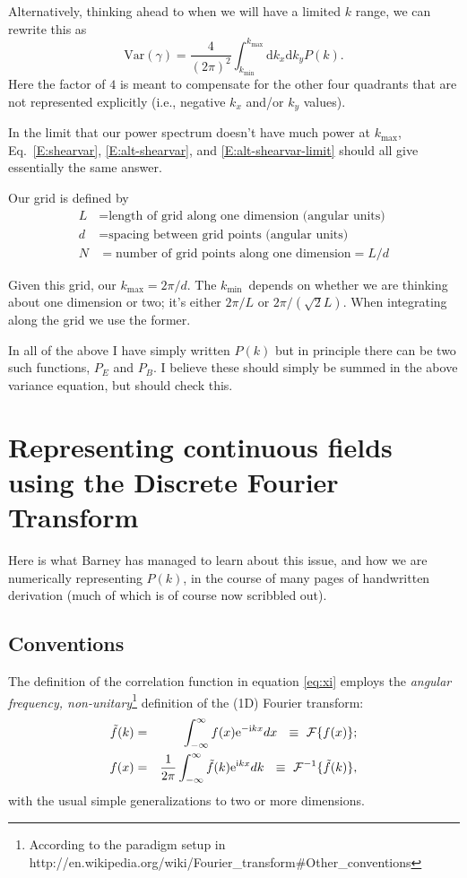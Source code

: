 \documentclass[preprint]{aastex}
\newcommand{\kmax}{\ensuremath{k_\mathrm{max}}}
\newcommand{\kmin}{\ensuremath{k_\mathrm{min}}}
\newcommand{\rmd}{\ensuremath{\mathrm{d}}}
\newcommand{\beq}{\begin{equation}}
\newcommand{\eeq}{\end{equation}}
\newcommand{\mi}{{\rm i}}
\newcommand{\me}{{\rm e}}
\begin{document}
Alternatively, thinking ahead to when we will have a limited $k$
range, we can rewrite this as
\beq\label{E:alt-shearvar-limit}
\mathrm{Var}(\gamma) = \frac{4}{(2\pi)^2} \int_{\kmin}^{\kmax} \rmd
k_x \rmd k_y P(k).
\eeq
Here the factor of $4$ is meant to compensate for the other four
quadrants that are not represented explicitly (i.e., negative $k_x$
and/or $k_y$ values).

In the limit that our power spectrum doesn't have much power at
\kmax, Eq.~\ref{E:shearvar}, \ref{E:alt-shearvar}, and
\ref{E:alt-shearvar-limit} should all give essentially the same answer.

Our
grid is defined by
\begin{align}
L &= \mbox{length of grid along one dimension (angular units)}\\
d &= \mbox{spacing between grid points (angular units)}\\
N &= \mbox{number of grid points along one dimension} = L/d
\end{align}

Given this grid, our $\kmax=2\pi/d$.  The \kmin\ depends on whether
we are thinking about one dimension or two; it's either $2\pi/L$ or
$2\pi/(\sqrt{2}L)$.  When integrating along the grid we use the former.

In all of the above I have simply written $P(k)$ but in principle there can be
two such functions, $P_{E}$ and $P_B$.  I believe these
should simply be summed in the above variance equation, but should check this.

\section{Representing continuous fields using the Discrete Fourier Transform}\label{S:discrete}

Here is what Barney has managed to learn about this issue, and how we
are numerically representing $P(k)$, in the course of many pages of
handwritten derivation (much of which is of course now scribbled out).

\subsection{Conventions}

The definition of the correlation function in equation \eqref{eq:xi}
employs the \emph{angular frequency, non-unitary}\footnote{According
  to the paradigm setup in
  http://en.wikipedia.org/wiki/Fourier\_transform\#Other\_conventions}
definition of the (1D) Fourier transform:
\begin{eqnarray}
\tilde{f}(k) & = & \int_{-\infty}^{\infty} f(x) \me^{-\mi k x}
dx ~ ~ \equiv ~ \mathcal{F} \{ f(x) \} \label{eq:fwdft} ; \\
f(x) & = & \frac{1}{2 \pi} \int_{-\infty}^{\infty} \tilde{f}(k) \me^{\mi k x}
dk ~ ~ \equiv ~ \mathcal{F}^{-1}\{ \tilde{f}(k) \} \label{eq:invft}, 
\end{eqnarray}
with the usual simple generalizations to two or more dimensions.
\end{document}

